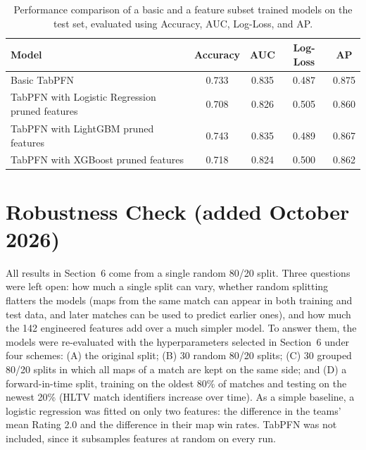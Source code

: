\documentclass[11pt]{article}
\begin{document}
\begin{table}[H]
\centering
\begin{tabular}{lcccc}
\hline
\textbf{Model} & \textbf{Accuracy} & \textbf{AUC} & \textbf{Log-Loss} & \textbf{AP} \\
\hline
Basic TabPFN                                       & 0.733 & 0.835 & 0.487 & 0.875 \\
TabPFN with Logistic Regression pruned features    & 0.708 & 0.826 & 0.505 & 0.860 \\
TabPFN with LightGBM pruned features               & 0.743 & 0.835 & 0.489 & 0.867 \\
TabPFN  with XGBoost pruned features               & 0.718 & 0.824 & 0.500 & 0.862 \\
\hline
\end{tabular}
\caption{Performance comparison of a basic and a feature subset trained models on the test set, evaluated using Accuracy, AUC, Log-Loss, and AP.}
\label{tab:TabPFN_comparison_table}
\end{table}

\section{Robustness Check (added October 2026)}
All results in Section~6 come from a single random 80/20 split. Three questions were left open: how much a single split can vary, whether random splitting flatters the models (maps from the same match can appear in both training and test data, and later matches can be used to predict earlier ones), and how much the 142 engineered features add over a much simpler model. To answer them, the models were re-evaluated with the hyperparameters selected in Section~6 under four schemes: (A) the original split; (B) 30 random 80/20 splits; (C) 30 grouped 80/20 splits in which all maps of a match are kept on the same side; and (D) a forward-in-time split, training on the oldest 80\% of matches and testing on the newest 20\% (HLTV match identifiers increase over time). As a simple baseline, a logistic regression was fitted on only two features: the difference in the teams' mean Rating 2.0 and the difference in their map win rates. TabPFN was not included, since it subsamples features at random on every run.
\end{document}
